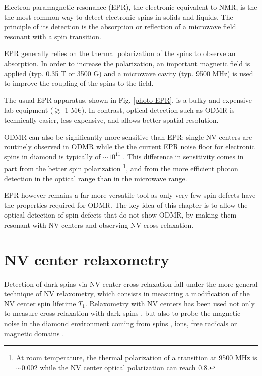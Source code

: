 \documentclass[a4paper,11pt]{report}
\begin{document}
Electron paramagnetic resonance (EPR), the electronic equivalent to NMR, is the the most common way to detect electronic spins in solids and liquids. The principle of its detection is the absorption or reflection of a microwave field resonant with a spin transition.

EPR generally relies on the thermal polarization of the spins to observe an absorption. In order to increase the polarization, an important magnetic field is applied (typ. 0.35 T or 3500 G) and a microwave cavity (typ. 9500 MHz) is used to improve the coupling of the spins to the field.

The usual EPR apparatus, shown in Fig. \ref{photo EPR}, is a bulky and expensive lab equipment ($\gtrsim$ 1 M€). In contrast, optical detection such as ODMR is technically easier, less expensive, and allows better spatial resolution. 

ODMR can also be significantly more sensitive than EPR: single NV centers are routinely observed in ODMR while the the current EPR noise floor for electronic spins in diamond is typically of $\sim 10^{11}$ \citep{mitchell2013x}. This difference in sensitivity comes in part from the better spin polarization \footnote{At room temperature, the thermal polarization of a transition at 9500 MHz is $\sim 0.002$ while the NV center optical polarization can reach 0.8.}, and from the more efficient photon detection in the optical range than in the microwave range.

EPR however remains a far more versatile tool as only very few spin defects have the properties required for ODMR. The key idea of this chapter is to allow the optical detection of spin defects that do not show ODMR, by making them resonant with NV centers and observing NV cross-relaxation.

\section{NV center relaxometry}

Detection of dark spins via NV center cross-relaxation fall under the more general technique of NV relaxometry, which consists in measuring a modification of the NV center spin lifetime $T_1$. Relaxometry with NV centers has been used not only to measure cross-relaxation with dark spins \citep{van1989cross, holliday1989optical, epstein2005anisotropic, armstrong2010nv,   hall2016detection, wickenbrock2016microwave,  wood2016wide,  alfasi2019detection, lazda2021cross}, but also to probe the magnetic noise in the diamond environment coming from spins \citep{steinert2013magnetic}, ions\citep{tetienne2013spin}, free radicals \citep{nie2021quantum}or magnetic domains \citep{finco2021imaging}. 
\end{document}
